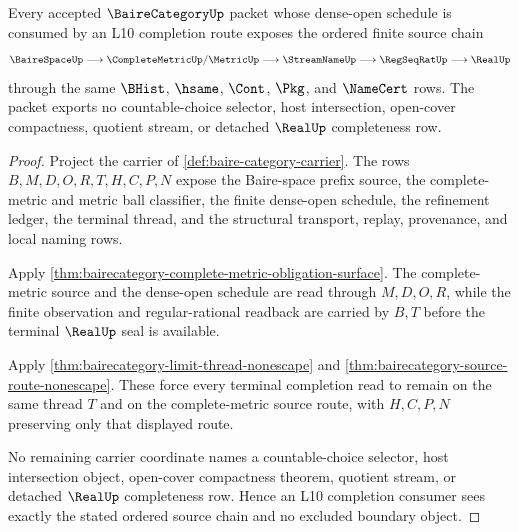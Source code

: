 \begin{theorem}
\label{thm:bairecategory-l10-completion-source-boundary}
Every accepted $\BaireCategoryUp$ packet whose dense-open schedule is consumed by an L10 completion route exposes the ordered finite source chain
$$
\BaireSpaceUp \longrightarrow \CompleteMetricUp/\MetricUp \longrightarrow \StreamNameUp \longrightarrow \RegSeqRatUp \longrightarrow \RealUp
$$
through the same $\BHist$, $\hsame$, $\Cont$, $\Pkg$, and $\NameCert$ rows. The packet exports no countable-choice selector, host intersection, open-cover compactness, quotient stream, or detached $\RealUp$ completeness row.
\end{theorem}
\begin{proof}
Project the carrier of \autoref{def:baire-category-carrier}. The rows $B,M,D,O,R,T,H,C,P,N$ expose the Baire-space prefix source, the complete-metric and metric ball classifier, the finite dense-open schedule, the refinement ledger, the terminal thread, and the structural transport, replay, provenance, and local naming rows.

Apply \autoref{thm:bairecategory-complete-metric-obligation-surface}. The complete-metric source and the dense-open schedule are read through $M,D,O,R$, while the finite observation and regular-rational readback are carried by $B,T$ before the terminal $\RealUp$ seal is available.

Apply \autoref{thm:bairecategory-limit-thread-nonescape} and \autoref{thm:bairecategory-source-route-nonescape}. These force every terminal completion read to remain on the same thread $T$ and on the complete-metric source route, with $H,C,P,N$ preserving only that displayed route.

No remaining carrier coordinate names a countable-choice selector, host intersection object, open-cover compactness theorem, quotient stream, or detached $\RealUp$ completeness row. Hence an L10 completion consumer sees exactly the stated ordered source chain and no excluded boundary object.
\end{proof}

